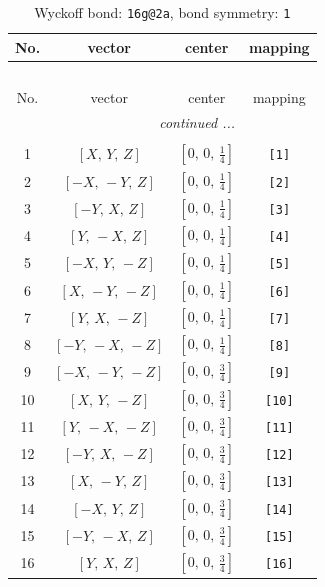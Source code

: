 \documentclass[fleqn,8pt]{jsarticle}
\begin{document}
\begin{longtable}{cccc}
\caption{Wyckoff bond: {\tt 16g@2a}, bond symmetry: {\tt 1}}
 \\
 \hline \hline
No. & vector & center & mapping \\ \hline \endfirsthead

\multicolumn{3}{l}{\tablename\ \thetable{}} \\
 \hline \hline
No. & vector & center & mapping \\ \hline \endhead

 \hline \hline
\multicolumn{3}{r}{\footnotesize\it continued ...} \\ \endfoot

 \hline \hline
\multicolumn{3}{r}{} \\ \endlastfoot

1 & $\left[ X,\, Y,\, Z \right]$ & $\left[ 0,\, 0,\, \frac{1}{4} \right]$ & {\tt [1]} \\ \hline
2 & $\left[ - X,\, - Y,\, Z \right]$ & $\left[ 0,\, 0,\, \frac{1}{4} \right]$ & {\tt [2]} \\ \hline
3 & $\left[ - Y,\, X,\, Z \right]$ & $\left[ 0,\, 0,\, \frac{1}{4} \right]$ & {\tt [3]} \\ \hline
4 & $\left[ Y,\, - X,\, Z \right]$ & $\left[ 0,\, 0,\, \frac{1}{4} \right]$ & {\tt [4]} \\ \hline
5 & $\left[ - X,\, Y,\, - Z \right]$ & $\left[ 0,\, 0,\, \frac{1}{4} \right]$ & {\tt [5]} \\ \hline
6 & $\left[ X,\, - Y,\, - Z \right]$ & $\left[ 0,\, 0,\, \frac{1}{4} \right]$ & {\tt [6]} \\ \hline
7 & $\left[ Y,\, X,\, - Z \right]$ & $\left[ 0,\, 0,\, \frac{1}{4} \right]$ & {\tt [7]} \\ \hline
8 & $\left[ - Y,\, - X,\, - Z \right]$ & $\left[ 0,\, 0,\, \frac{1}{4} \right]$ & {\tt [8]} \\ \hline
9 & $\left[ - X,\, - Y,\, - Z \right]$ & $\left[ 0,\, 0,\, \frac{3}{4} \right]$ & {\tt [9]} \\ \hline
10 & $\left[ X,\, Y,\, - Z \right]$ & $\left[ 0,\, 0,\, \frac{3}{4} \right]$ & {\tt [10]} \\ \hline
11 & $\left[ Y,\, - X,\, - Z \right]$ & $\left[ 0,\, 0,\, \frac{3}{4} \right]$ & {\tt [11]} \\ \hline
12 & $\left[ - Y,\, X,\, - Z \right]$ & $\left[ 0,\, 0,\, \frac{3}{4} \right]$ & {\tt [12]} \\ \hline
13 & $\left[ X,\, - Y,\, Z \right]$ & $\left[ 0,\, 0,\, \frac{3}{4} \right]$ & {\tt [13]} \\ \hline
14 & $\left[ - X,\, Y,\, Z \right]$ & $\left[ 0,\, 0,\, \frac{3}{4} \right]$ & {\tt [14]} \\ \hline
15 & $\left[ - Y,\, - X,\, Z \right]$ & $\left[ 0,\, 0,\, \frac{3}{4} \right]$ & {\tt [15]} \\ \hline
16 & $\left[ Y,\, X,\, Z \right]$ & $\left[ 0,\, 0,\, \frac{3}{4} \right]$ & {\tt [16]} \\
\end{longtable}
\end{document}

